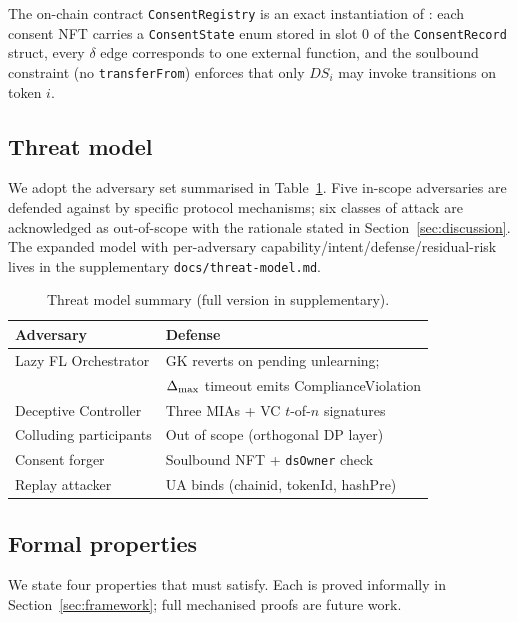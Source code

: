 The on-chain contract \texttt{ConsentRegistry} is an exact
instantiation of \clsm: each consent NFT carries a \texttt{ConsentState}
enum stored in slot 0 of the \texttt{ConsentRecord} struct, every
$\delta$ edge corresponds to one external function, and the soulbound
constraint (no \texttt{transferFrom}) enforces that only $\mathit{DS}_i$
may invoke transitions on token $i$.

\subsection{Threat model}

We adopt the adversary set summarised in
Table~\ref{tab:threat}. Five in-scope adversaries are defended against
by specific protocol mechanisms; six classes of attack are
acknowledged as out-of-scope with the rationale stated in
Section~\ref{sec:discussion}. The expanded model with per-adversary
capability/intent/defense/residual-risk lives in the supplementary
\texttt{docs/threat-model.md}.

\begin{table}[t]
\centering
\caption{Threat model summary (full version in supplementary).}
\label{tab:threat}
\small
\begin{tabular}{ll}
\toprule
Adversary & Defense \\
\midrule
Lazy FL Orchestrator & GK reverts on pending unlearning; \\
                     & $\Delta_{\max}$ timeout emits ComplianceViolation \\
Deceptive Controller & Three MIAs + VC $t$-of-$n$ signatures \\
Colluding participants & Out of scope (orthogonal DP layer) \\
Consent forger & Soulbound NFT + \texttt{dsOwner} check \\
Replay attacker & UA binds (chainid, tokenId, hashPre) \\
\bottomrule
\end{tabular}
\end{table}

\subsection{Formal properties}
\label{sec:properties}

We state four properties that \sysname must satisfy. Each is proved
informally in Section~\ref{sec:framework}; full mechanised proofs are
future work.

